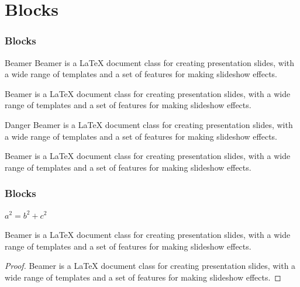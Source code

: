 \documentclass[aspectratio=169]{beamer}
\begin{document}
\section{Blocks}
\begin{frame}
\frametitle{Blocks}

\begin{block}{Beamer}
Beamer is a LaTeX document class for creating presentation slides, with a wide range of templates and a set of features for making slideshow effects.
\end{block}

\begin{definition}
Beamer is a LaTeX document class for creating presentation slides, with a wide range of templates and a set of features for making slideshow effects.
\end{definition}

\begin{alertblock}{Danger}
Beamer is a LaTeX document class for creating presentation slides, with a wide range of templates and a set of features for making slideshow effects.
\end{alertblock}

\begin{example}
Beamer is a LaTeX document class for creating presentation slides, with a wide range of templates and a set of features for making slideshow effects.
\end{example}

\end{frame}

\begin{frame}
\frametitle{Blocks}

\begin{theorem}[Pythagoras]
$a^2 = b^2 + c^2$
\end{theorem}

\begin{corollary}
Beamer is a LaTeX document class for creating presentation slides, with a wide range of templates and a set of features for making slideshow effects.
\end{corollary}

\begin{proof}
Beamer is a LaTeX document class for creating presentation slides, with a wide range of templates and a set of features for making slideshow effects.
\end{proof}

\end{frame}
\end{document}
